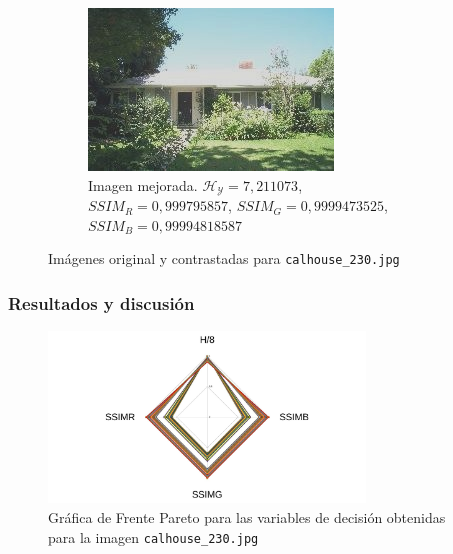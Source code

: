 \documentclass[usenames,dvipsnames]{beamer}
\begin{document}
\begin{frame}
\begin{figure}[H]
\begin{subfigure}[t]{0.45\textwidth}
    \includegraphics[width=\textwidth]{graphics/calhouse_0230_20-20-0020072469292179818.jpg}
    \caption{Imagen mejorada. $\mathscr{H_Y}=7,211073$, $SSIM_R=0,999795857$, $SSIM_G=0,9999473525$, $SSIM_B=0,99994818587$}
    \label{fig:casa1enhanced3}
    \end{subfigure}

    \caption{Imágenes original y contrastadas para \texttt{calhouse\_230.jpg}}\label{fig:casa1}
    \end{figure}

    \end{frame}


\begin{frame}
\frametitle{Resultados y discusión} 

\begin{figure}[H]
\centering
    \includegraphics[width=0.75\textwidth]{graphics/calhouse_230_2.jpg}
    \caption{Gráfica de Frente Pareto para las variables de decisión obtenidas para la imagen \texttt{calhouse\_230.jpg}}
    \label{fig:casa1enhancedfp}
\end{figure}

\end{frame}
\end{document}
